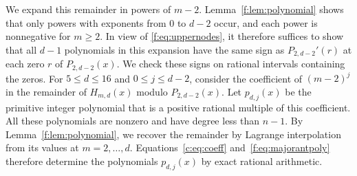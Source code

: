 \documentclass[10pt,a4paper]{article}
\numberwithin{equation}{section}
\theoremstyle{remark}\newtheorem{remark}[theorem]{Remark}
\begin{document}
We expand this remainder in powers of $m-2$.
Lemma~\ref{f:lem:polynomial} shows that only powers with exponents from
$0$ to $d-2$ occur, and each power is nonnegative for $m\ge2$.
In view of \eqref{f:eq:uppernodes}, it therefore
suffices to show that all $d-1$ polynomials in this expansion have the same
sign as $P_{2,d-2}'(r)$ at each zero $r$ of $P_{2,d-2}(x)$.
We check these signs on rational intervals containing the zeros.
For $5\le d\le16$ and $0\le j\le d-2$, consider the coefficient of
$(m-2)^j$ in the remainder of $H_{m,d}(x)$ modulo $P_{2,d-2}(x)$. Let
$p_{d,j}(x)$ be the primitive integer polynomial that is a positive
rational multiple of this coefficient. All these polynomials are nonzero and
have degree less than $n-1$.
By Lemma~\ref{f:lem:polynomial}, we recover the remainder by Lagrange
interpolation from its values at $m=2,\ldots,d$.
Equations~\eqref{c:eq:coeff} and~\eqref{f:eq:majorantpoly} therefore
determine the polynomials $p_{d,j}(x)$ by exact rational arithmetic.
\end{document}
